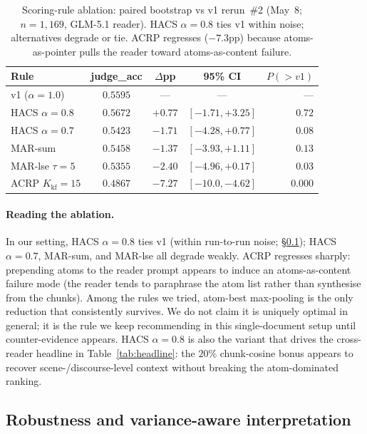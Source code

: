 \documentclass{article}
\theoremstyle{plain}
\theoremstyle{definition}
\theoremstyle{remark}
\begin{document}
\begin{table}[t]
  \caption{Scoring-rule ablation: paired bootstrap vs v1 rerun~\#2 (May~8;
    $n\!=\!1{,}169$, GLM-5.1 reader). HACS $\alpha\!=\!0.8$ ties v1 within
    noise; alternatives degrade or tie. ACRP regresses ($-7.3$pp) because
    atoms-as-pointer pulls the reader toward atoms-as-content failure.}
  \label{tab:ablation}
  \vskip 0.05in
  \centering
  \small
  \begin{tabular}{@{}lcccr@{}}
    \toprule
    Rule & judge\_acc & $\Delta$pp & 95\% CI & $P(>v1)$ \\
    \midrule
    v1 ($\alpha\!=\!1.0$) & $0.5595$ & --- & --- & --- \\
    HACS $\alpha\!=\!0.8$ & $0.5672$ & $+0.77$ & $[-1.71,+3.25]$ & $0.72$ \\
    HACS $\alpha\!=\!0.7$ & $0.5423$ & $-1.71$ & $[-4.28,+0.77]$ & $0.08$ \\
    MAR-sum & $0.5458$ & $-1.37$ & $[-3.93,+1.11]$ & $0.13$ \\
    MAR-lse $\tau\!=\!5$ & $0.5355$ & $-2.40$ & $[-4.96,+0.17]$ & $0.03$ \\
    ACRP $K_{\mathrm{kf}}\!=\!15$ & $0.4867$ & $-7.27$ & $[-10.0,-4.62]$ & $0.000$ \\
    \bottomrule
  \end{tabular}
\end{table}

\paragraph{Reading the ablation.} In our setting, HACS $\alpha\!=\!0.8$ ties v1
(within run-to-run noise; \S\ref{sec:variance}); HACS $\alpha\!=\!0.7$, MAR-sum,
and MAR-lse all degrade weakly. ACRP regresses sharply: prepending atoms to
the reader prompt appears to induce an atoms-as-content failure mode (the
reader tends to paraphrase the atom list rather than synthesise from the
chunks). Among the rules we tried, atom-best max-pooling is the only
reduction that consistently survives. We do not claim it is uniquely optimal
in general; it is the rule we keep recommending in this single-document setup
until counter-evidence appears. HACS $\alpha\!=\!0.8$ is also the variant
that drives the cross-reader headline in Table~\ref{tab:headline}: the
$20\%$ chunk-cosine bonus appears to recover scene-/discourse-level
context without breaking the atom-dominated ranking.

\subsection{Robustness and variance-aware interpretation}
\label{sec:variance}
\end{document}
